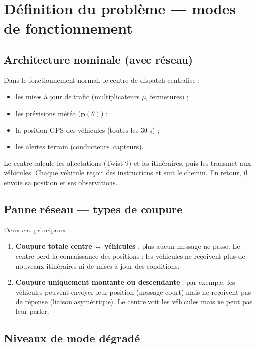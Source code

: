 \documentclass[12pt,a4paper]{article}
\theoremstyle{definition}
\theoremstyle{remark}
\begin{document}
\newpage

\section{Définition du problème — modes de fonctionnement}

\subsection{Architecture nominale (avec réseau)}

Dans le fonctionnement normal, le centre de dispatch centralise :
\begin{itemize}
  \item les mises à jour de trafic (multiplicateurs $\mu$, fermetures) ;
  \item les prévisions météo ($\mathbf{p}(\theta)$) ;
  \item la position GPS des véhicules (toutes les 30 s) ;
  \item les alertes terrain (conducteurs, capteurs).
\end{itemize}
Le centre calcule les affectations (Twist 9) et les itinéraires, puis
les transmet aux véhicules. Chaque véhicule reçoit des instructions
et suit le chemin. En retour, il envoie sa position et ses observations.

\subsection{Panne réseau — types de coupure}

Deux cas principaux :

\begin{enumerate}[leftmargin=2em, itemsep=4pt]
  \item \textbf{Coupure totale centre ↔ véhicules} : plus aucun message
        ne passe. Le centre perd la connaissance des positions ; les
        véhicules ne reçoivent plus de nouveaux itinéraires ni de mises
        à jour des conditions.
  \item \textbf{Coupure uniquement montante ou descendante} : par exemple,
        les véhicules peuvent envoyer leur position (message court) mais
        ne reçoivent pas de réponse (liaison asymétrique). Le centre
        voit les véhicules mais ne peut pas leur parler.
\end{enumerate}

\subsection{Niveaux de mode dégradé}
\end{document}
